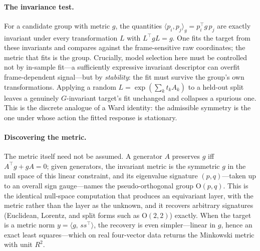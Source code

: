 \documentclass[11pt]{article}
\theoremstyle{definition}
\begin{document}
\paragraph{The invariance test.} For a candidate group with metric $g$, the quantities
$\langle p_i,p_j\rangle_g=p_i^{\!\top}g\,p_j$ are exactly invariant under every transformation
$L$ with $L^{\!\top}gL=g$. One fits the target from these invariants and compares against the
frame-sensitive raw coordinates; the metric that fits is the group. Crucially, model selection here
must be controlled not by in-sample fit---a sufficiently expressive invariant descriptor can overfit
frame-dependent signal---but by \emph{stability}: the fit must survive the group's own
transformations. Applying a random $L=\exp(\sum_k t_kA_k)$ to a held-out split leaves a genuinely
$G$-invariant target's fit unchanged and collapses a spurious one. This is the discrete analogue of a
Ward identity: the admissible symmetry is the one under whose action the fitted response is stationary.

\paragraph{Discovering the metric.} The metric itself need not be assumed. A generator $A$ preserves
$g$ iff $A^{\!\top}g+gA=0$; given generators, the invariant metric is the symmetric $g$ in the null
space of this linear constraint, and its eigenvalue signature $(p,q)$---taken up to an overall sign
gauge---names the pseudo-orthogonal group $\mathrm{O}(p,q)$. This is the identical null-space
computation that produces an equivariant layer, with the metric rather than the layer as the unknown,
and it recovers arbitrary signatures (Euclidean, Lorentz, and split forms such as
$\mathrm{O}(2,2)$) exactly. When the target is a metric norm $y=\langle g,\,ss^{\!\top}\rangle$, the
recovery is even simpler---linear in $g$, hence an exact least squares---which on real four-vector
data returns the Minkowski metric with unit $R^2$.
\end{document}
